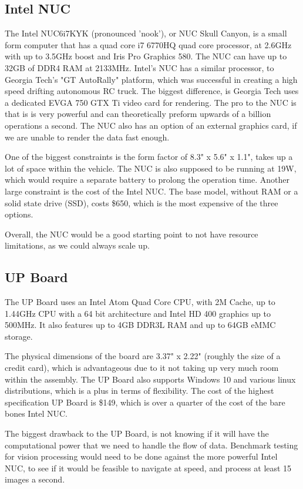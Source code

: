 \documentclass[compsoc,draftclsnofoot,onecolumn,10pt]{IEEEtran}
\begin{document}
\subsection{Intel NUC}
The Intel NUC6i7KYK (pronounced 'nook'), or NUC Skull Canyon, is a small form computer that has a quad core i7 6770HQ quad core processor, at 2.6GHz with up to 3.5GHz boost and Iris Pro Graphics 580. 
The NUC can have up to 32GB of DDR4 RAM at 2133MHz. 
Intel's NUC has a similar processor, to Georgia Tech's "GT AutoRally" platform, which was successful in creating a high speed drifting autonomous RC truck. 
The biggest difference, is Georgia Tech uses a dedicated EVGA 750 GTX Ti video card for rendering.
The pro to the NUC is that is is very powerful and can theoretically preform upwards of a billion operations a second. 
The NUC also has an option of an external graphics card, if we are unable to render the data fast enough. \par
One of the biggest constraints is the form factor of 8.3" x 5.6" x 1.1", takes up a lot of space within the vehicle.
The NUC is also supposed to be running at 19W, which would require a separate battery to prolong the operation time. 
Another large constraint is the cost of the Intel NUC. 
The base model, without RAM or a solid state drive (SSD), costs \$650, which is the most expensive of the three options. \par
Overall, the NUC would be a good starting point to not have resource limitations, as we could always scale up. 

\subsection{UP Board}
The UP Board uses an Intel Atom Quad Core CPU, with 2M Cache, up to 1.44GHz CPU with a 64 bit architecture and Intel HD 400 graphics up to 500MHz. 
It also features up to 4GB DDR3L RAM and up to 64GB eMMC storage. \par
The physical dimensions of the board are 3.37" x 2.22" (roughly the size of a credit card), which is advantageous due to it not taking up very much room within the assembly. 
The UP Board also supports Windows 10 and various linux distributions, which is a plus in terms of flexibility. 
The cost of the highest specification UP Board is \$149, which is over a quarter of the cost of the bare bones Intel NUC. \par
The biggest drawback to the UP Board, is not knowing if it will have the computational power that we need to handle the flow of data. 
Benchmark testing for vision processing would need to be done against the more powerful Intel NUC, to see if it would be feasible to navigate at speed, and process at least 15 images a second. 
\end{document}
